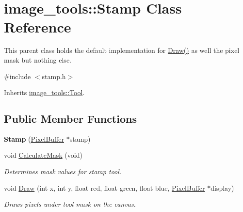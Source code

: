 \hypertarget{classimage__tools_1_1Stamp}{}\section{image\+\_\+tools\+:\+:Stamp Class Reference}
\label{classimage__tools_1_1Stamp}


This parent class holds the default implementation for \hyperlink{classimage__tools_1_1Stamp_aad46ea95e5a9c4a5ef90ee262262070f}{Draw()} as well the pixel mask but nothing else.  




{\ttfamily \#include $<$stamp.\+h$>$}



Inherits \hyperlink{classimage__tools_1_1Tool}{image\+\_\+tools\+::\+Tool}.

\subsection*{Public Member Functions}
\begin{DoxyCompactItemize}
\item 
{\bfseries Stamp} (\hyperlink{classimage__tools_1_1PixelBuffer}{Pixel\+Buffer} $\ast$stamp)\hypertarget{classimage__tools_1_1Stamp_abac301ccb4549a55928d189b3874bdf5}{}\label{classimage__tools_1_1Stamp_abac301ccb4549a55928d189b3874bdf5}

\item 
void \hyperlink{classimage__tools_1_1Stamp_a8ac2c6da5d7c112d3bdd1dc75298e704}{Calculate\+Mask} (void)\hypertarget{classimage__tools_1_1Stamp_a8ac2c6da5d7c112d3bdd1dc75298e704}{}\label{classimage__tools_1_1Stamp_a8ac2c6da5d7c112d3bdd1dc75298e704}

\begin{DoxyCompactList}\small\item\em Determines mask values for stamp tool. \end{DoxyCompactList}\item 
void \hyperlink{classimage__tools_1_1Stamp_aad46ea95e5a9c4a5ef90ee262262070f}{Draw} (int x, int y, float red, float green, float blue, \hyperlink{classimage__tools_1_1PixelBuffer}{Pixel\+Buffer} $\ast$display)\hypertarget{classimage__tools_1_1Stamp_aad46ea95e5a9c4a5ef90ee262262070f}{}\label{classimage__tools_1_1Stamp_aad46ea95e5a9c4a5ef90ee262262070f}

\begin{DoxyCompactList}\small\item\em Draws pixels under tool mask on the canvas. \end{DoxyCompactList}\end{DoxyCompactItemize}
